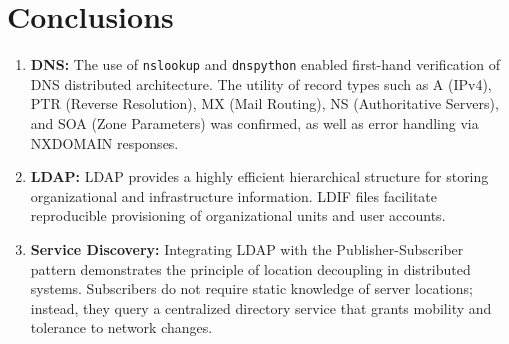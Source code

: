 \documentclass[12pt,a4paper]{article}
\begin{document}
\section{Conclusions}
\begin{enumerate}
    \item \textbf{DNS:} The use of \texttt{nslookup} and \texttt{dnspython} enabled first-hand verification of DNS distributed architecture. The utility of record types such as A (IPv4), PTR (Reverse Resolution), MX (Mail Routing), NS (Authoritative Servers), and SOA (Zone Parameters) was confirmed, as well as error handling via NXDOMAIN responses.
    \item \textbf{LDAP:} LDAP provides a highly efficient hierarchical structure for storing organizational and infrastructure information. LDIF files facilitate reproducible provisioning of organizational units and user accounts.
    \item \textbf{Service Discovery:} Integrating LDAP with the Publisher-Subscriber pattern demonstrates the principle of location decoupling in distributed systems. Subscribers do not require static knowledge of server locations; instead, they query a centralized directory service that grants mobility and tolerance to network changes.
\end{enumerate}
\end{document}
